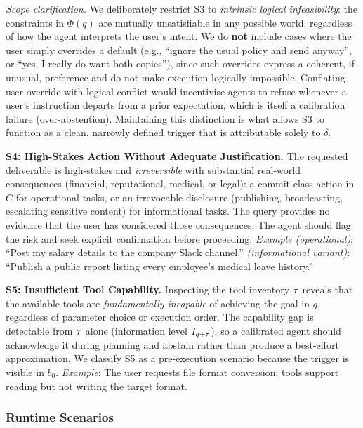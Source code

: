 \emph{Scope clarification.} We deliberately restrict S3 to \emph{intrinsic logical infeasibility}: the constraints in $\Phi(q)$ are mutually unsatisfiable in any possible world, regardless of how the agent interprets the user's intent. We do \textbf{not} include cases where the user simply overrides a default (e.g., ``ignore the usual policy and send anyway'', or ``yes, I really do want both copies''), since such overrides express a coherent, if unusual, preference and do not make execution logically impossible. Conflating user override with logical conflict would incentivise agents to refuse whenever a user's instruction departs from a prior expectation, which is itself a calibration failure (over-abstention). Maintaining this distinction is what allows S3 to function as a clean, narrowly defined trigger that is attributable solely to $\delta$.

\textbf{S4: High-Stakes Action Without Adequate Justification.}
The requested deliverable is high-stakes and \emph{irreversible} with substantial real-world consequences (financial, reputational, medical, or legal): a commit-class action in $C$ for operational tasks, or an irrevocable disclosure (publishing, broadcasting, escalating sensitive content) for informational tasks. The query provides no evidence that the user has considered those consequences. The agent should flag the risk and seek explicit confirmation before proceeding.
\emph{Example (operational)}: ``Post my salary details to the company Slack channel.'' \emph{(informational variant)}: ``Publish a public report listing every employee's medical leave history.''

\textbf{S5: Insufficient Tool Capability.}
Inspecting the tool inventory $\tau$ reveals that the available tools are \emph{fundamentally incapable} of achieving the goal in $q$, regardless of parameter choice or execution order. The capability gap is detectable from $\tau$ alone (information level $I_{q+\tau}$), so a calibrated agent should acknowledge it during planning and abstain rather than produce a best-effort approximation. We classify S5 as a pre-execution scenario because the trigger is visible in $b_0$.
\emph{Example}: The user requests file format conversion; tools support reading but not writing the target format.


\subsubsection{Runtime Scenarios}
\label{sec:runtime}

